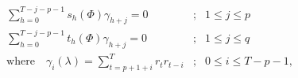 \documentclass[letterpaper,12pt]{article}
\begin{document}
\pagestyle{empty}
\thispagestyle{empty}

\noindent

\begin{eqnarray}
\sum_{h=0}^{T-j-p-1} s_h(\Phi) \gamma_{h+j} = 0 &;& 1 \le j \le p \nonumber\\[6pt]\label{eq:uno}
\sum_{h=0}^{T-j-p-1} t_h(\Phi) \gamma_{h+j} = 0 &;& 1 \le j \le q \\[6pt]
\mathrm{where } \quad \gamma_i(\lambda) = \sum_{t=p+1+i}^T r_{t} r_{t-i} &;& 0 \le i \le T-p-1 \label{eq:dos},
\end{eqnarray}
\end{document}
